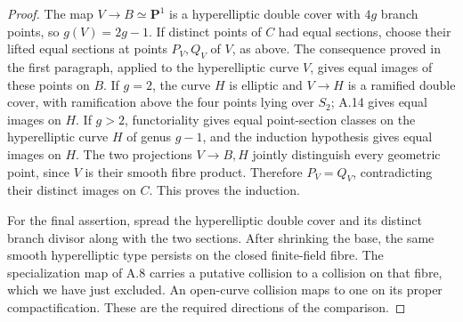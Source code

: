 \begin{proof}
The map $V\to B\simeq\mathbf P^1$ is a hyperelliptic
double cover with $4g$ branch points, so $g(V)=2g-1$.
If distinct points of $C$ had equal sections, choose their
lifted equal sections at points $P_V,Q_V$ of $V$, as above.
The consequence proved in the first paragraph, applied to
the hyperelliptic curve $V$, gives equal images of these
points on $B$.
If $g=2$, the curve $H$ is elliptic and $V\to H$ is a
ramified double cover, with ramification above the four
points lying over $S_2$; A.14 gives equal images on $H$.
If $g>2$, functoriality gives equal point-section classes
on the hyperelliptic curve $H$ of genus $g-1$, and the
induction hypothesis gives equal images on $H$.
The two projections $V\to B,H$ jointly distinguish every
geometric point, since $V$ is their smooth fibre product.
Therefore $P_V=Q_V$, contradicting their distinct images
on $C$. This proves the induction.

For the final assertion, spread the hyperelliptic double
cover and its distinct branch divisor along with the two
sections. After shrinking the base, the same smooth
hyperelliptic type persists on the closed finite-field
fibre. The specialization map of A.8 carries a putative
collision to a collision on that fibre, which we have
just excluded. An open-curve collision maps to one on
its proper compactification. These are the required
directions of the comparison.
\end{proof}

